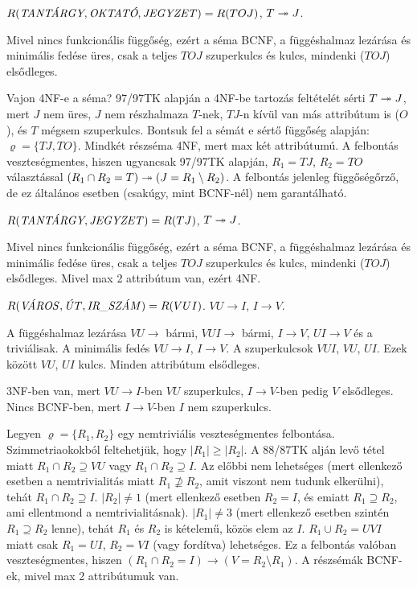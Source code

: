 \documentclass{article}
\begin{document}
$R(\hbox{\it TANTÁRGY},\hbox{\it OKTATÓ},\hbox{\it JEGYZET\/})=R(TOJ)$, $T\twoheadrightarrow J$.

\megoldas Mivel nincs funkcionális függőség, ezért a séma BCNF, a
függéshalmaz lezárása és minimális fedése üres, csak a teljes $TOJ$
szuperkulcs és kulcs, mindenki ($TOJ$) elsődleges.

Vajon 4NF-e a séma? 97/97TK alapján a 4NF-be tartozás feltételét sérti
$T\twoheadrightarrow J$, mert $J$ nem üres, $J$ nem részhalmaza $T$-nek, $TJ$-n kívül
van más attribútum is ($O$), és $T$ mégsem szuperkulcs. Bontsuk fel a sémát
e sértő függőség alapján: $\varrho=\{TJ,TO\}$. Mindkét részséma 4NF, mert
max két attribútumú. A felbontás veszteségmentes, hiszen ugyancsak 97/97TK
alapján, $R_1=TJ$, $R_2=TO$ választással $(R_1\cap R_2=T)\twoheadrightarrow
(J=R_1\setminus R_2)$. A felbontás jelenleg függőségőrző, de ez általános
esetben (csakúgy, mint BCNF-nél) nem garantálható.

$R(\hbox{\it TANTÁRGY},\hbox{\it JEGYZET\/})=R(TJ)$, $T\twoheadrightarrow J$.

\megoldas Mivel nincs funkcionális függőség, ezért a séma BCNF, a
függéshalmaz lezárása és minimális fedése üres, csak a teljes $TOJ$
szuperkulcs és kulcs, mindenki ($TOJ$) elsődleges. Mivel max 2 attribútum
van, ezért 4NF.

$R(\hbox{\it VÁROS\/},\hbox{\it ÚT\/},\hbox{\it IR\char 95 SZÁM\/})=
R(VUI)$. $VU\to I$, $I\to V$.

\megoldas A függéshalmaz lezárása $VU\to$ bármi, $VUI\to$
bármi, $I\to V$, $UI\to V$ és a triviálisak.
A minimális fedés $VU\to I$, $I\to V$.
A szuperkulcsok $VUI$, $VU$, $UI$. Ezek között $VU$, $UI$ kulcs.
Minden attribútum elsődleges.

3NF-ben van, mert $VU\to I$-ben $VU$ szuperkulcs, $I\to V$-ben pedig $V$
elsődleges. Nincs BCNF-ben, mert $I\to V$-ben $I$ nem szuperkulcs.

Legyen $\varrho=\{R_1, R_2\}$ egy nemtriviális veszteségmentes felbontása.
Szimmetriaokokból feltehetjük, hogy $|R_1|\ge|R_2|$. A 88/87TK alján levő tétel
miatt $R_1\cap R_2\supseteq VU$ vagy $R_1\cap R_2\supseteq I$. Az előbbi nem
lehetséges (mert ellenkező esetben a nemtrivialitás miatt
$R_1\not\supseteq R_2$, amit viszont nem tudunk elkerülni), tehát
$R_1\cap R_2\supseteq I$. $|R_2|\ne1$ (mert ellenkező esetben $R_2=I$, és
emiatt $R_1\supseteq R_2$, ami ellentmond a nemtrivialitásnak).
$|R_1|\ne 3$ (mert ellenkező esetben szintén $R_1\supseteq R_2$ lenne),
tehát $R_1$ és $R_2$ is kételemű, közös elem az $I$. $R_1\cup R_2=UVI$ miatt
csak $R_1=UI$, $R_2=VI$ (vagy fordítva) lehetséges. Ez a felbontás valóban
veszteségmentes, hiszen $(R_1\cap R_2=I)\to(V=R_2\setminus R_1)$. A
részsémák BCNF-ek, mivel max 2 attribútumuk van.
\end{document}
